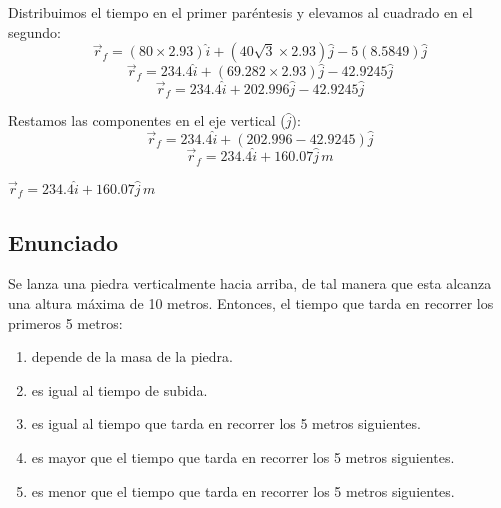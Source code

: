 \documentclass[12pt, a4paper]{article}
\begin{document}
Distribuimos el tiempo en el primer paréntesis y elevamos al cuadrado en el segundo:
$$ \vec{r}_f = (80 \times 2.93)\hat{i} + (40\sqrt{3} \times 2.93)\hat{j} - 5(8.5849)\hat{j} $$
$$ \vec{r}_f = 234.4\hat{i} + (69.282 \times 2.93)\hat{j} - 42.9245\hat{j} $$
$$ \vec{r}_f = 234.4\hat{i} + 202.996\hat{j} - 42.9245\hat{j} $$

Restamos las componentes en el eje vertical ($\hat{j}$):
$$ \vec{r}_f = 234.4\hat{i} + (202.996 - 42.9245)\hat{j} $$
$$ \vec{r}_f = 234.4\hat{i} + 160.07\hat{j} \, \si{m} $$

\begin{tcolorbox}[colback=green!5!white, colframe=green!50!black, title=Respuesta Final]
\centering \Large $\vec{r}_f = 234.4\hat{i} + 160.07\hat{j} \, \si{m}$
\end{tcolorbox}

\newpage

\subsection*{Enunciado}
Se lanza una piedra verticalmente hacia arriba, de tal manera que esta alcanza una altura máxima de 10 metros. Entonces, el tiempo que tarda en recorrer los primeros 5 metros:
\begin{enumerate}[label=\alph*)]
    \item depende de la masa de la piedra.
    \item es igual al tiempo de subida.
    \item es igual al tiempo que tarda en recorrer los 5 metros siguientes.
    \item es mayor que el tiempo que tarda en recorrer los 5 metros siguientes.
    \item es menor que el tiempo que tarda en recorrer los 5 metros siguientes.
\end{enumerate}

\begin{center}
\end{center}
\end{document}
